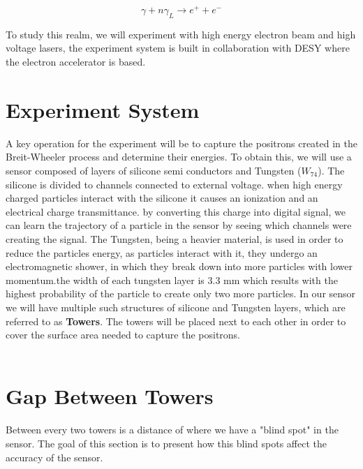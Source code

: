 \documentclass[11pt]{article}
\newcommand{\ben}[1]{\todo[inline,color=orange!20!white]{\textbf{Ben:} #1}}
\begin{document}
\begin{equation}
    \gamma + n \gamma_L \longrightarrow e^+ + e^-
\end{equation}

To study this realm, we will experiment with high energy electron beam and high voltage lasers, the experiment system is built in collaboration with DESY where the electron accelerator is based.







\section{Experiment System}



A key operation for the experiment will be to capture the positrons created in the Breit-Wheeler process and determine their energies. To obtain this, we will use a sensor composed of layers of silicone semi conductors and Tungsten ($W_{74}$).
The silicone is divided to channels connected to external voltage. when high energy charged particles interact with the silicone it causes an ionization and an electrical charge transmittance. by converting this charge into digital signal, we can learn the trajectory of a particle in the sensor by seeing which channels were creating the signal.
The Tungsten, being a heavier material, is used in order to reduce the particles energy, as particles interact with it, they undergo an electromagnetic shower, in which they break down into more particles with lower momentum.the width of each tungsten layer is 3.3 mm  which results with the highest probability of the particle to create only two more particles.
In our sensor we will have multiple such structures of silicone and Tungsten layers, which are referred to as \textbf{Towers}. The towers will be placed next to each other in order to cover the surface area needed to capture the positrons.
\\ \\



\section{Gap Between Towers}

Between every two towers is a distance of \ben{check dist between towers} where we have a "blind spot" in the sensor. The goal of this section is to present how this blind spots affect the accuracy of the sensor.
\end{document}

